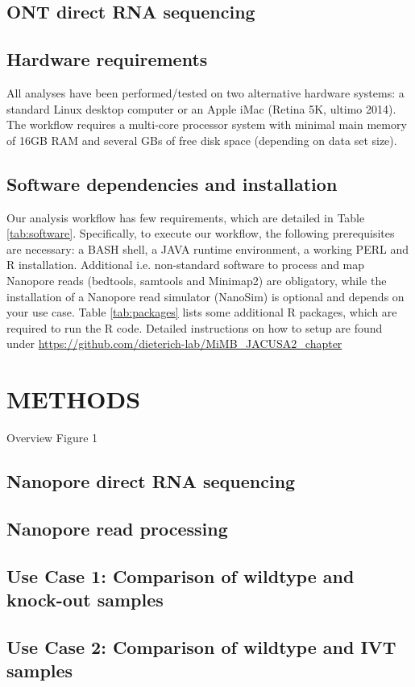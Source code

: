 \documentclass[times, 11pt, a4paper]{article}
\begin{document}
\subsection*{ONT direct RNA sequencing}

\subsection*{Hardware requirements}
All analyses have been performed/tested on two alternative hardware systems:
a standard Linux desktop computer or an Apple iMac (Retina 5K, ultimo 2014).
The workflow requires a multi-core processor system with minimal main memory of 16GB RAM
and several GBs of free disk space (depending on data set size).

\subsection*{Software dependencies and installation}
Our analysis workflow has few requirements, which are detailed in Table \ref{tab:software}. Specifically, to execute our workflow, the following prerequisites are necessary: a BASH shell, a JAVA runtime environment, a working PERL and R installation. Additional i.e. non-standard software to process and map Nanopore reads (bedtools, samtools and Minimap2) are obligatory, while the installation of a Nanopore read simulator (NanoSim) is optional and depends on your use case. Table \ref{tab:packages} lists some additional R packages, which are required to run the R code. Detailed instructions on how to setup are found under \url{https://github.com/dieterich-lab/MiMB_JACUSA2_chapter} 

\section*{METHODS}
Overview Figure 1
\subsection*{Nanopore direct RNA sequencing}
\subsection*{Nanopore read processing}
\subsection*{Use Case 1: Comparison of wildtype and knock-out samples}
\subsection*{Use Case 2: Comparison of wildtype and IVT samples}
\end{document}

